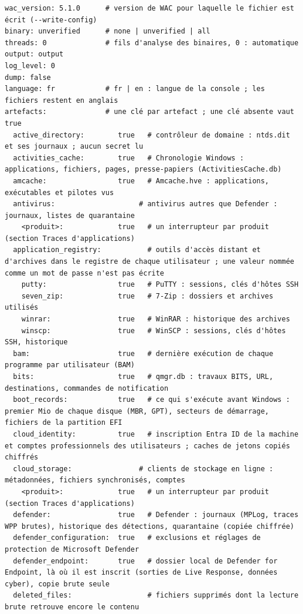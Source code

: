 \documentclass[11pt,a4paper,oneside]{report}
\begin{document}
\begin{lstlisting}
wac_version: 5.1.0      # version de WAC pour laquelle le fichier est écrit (--write-config)
binary: unverified      # none | unverified | all
threads: 0              # fils d'analyse des binaires, 0 : automatique
output: output
log_level: 0
dump: false
language: fr            # fr | en : langue de la console ; les fichiers restent en anglais
artefacts:              # une clé par artefact ; une clé absente vaut true
  active_directory:        true   # contrôleur de domaine : ntds.dit et ses journaux ; aucun secret lu
  activities_cache:        true   # Chronologie Windows : applications, fichiers, pages, presse-papiers (ActivitiesCache.db)
  amcache:                 true   # Amcache.hve : applications, exécutables et pilotes vus
  antivirus:                    # antivirus autres que Defender : journaux, listes de quarantaine
    <produit>:             true   # un interrupteur par produit (section Traces d'applications)
  application_registry:           # outils d'accès distant et d'archives dans le registre de chaque utilisateur ; une valeur nommée comme un mot de passe n'est pas écrite
    putty:                 true   # PuTTY : sessions, clés d'hôtes SSH
    seven_zip:             true   # 7-Zip : dossiers et archives utilisés
    winrar:                true   # WinRAR : historique des archives
    winscp:                true   # WinSCP : sessions, clés d'hôtes SSH, historique
  bam:                     true   # dernière exécution de chaque programme par utilisateur (BAM)
  bits:                    true   # qmgr.db : travaux BITS, URL, destinations, commandes de notification
  boot_records:            true   # ce qui s'exécute avant Windows : premier Mio de chaque disque (MBR, GPT), secteurs de démarrage, fichiers de la partition EFI
  cloud_identity:          true   # inscription Entra ID de la machine et comptes professionnels des utilisateurs ; caches de jetons copiés chiffrés
  cloud_storage:                # clients de stockage en ligne : métadonnées, fichiers synchronisés, comptes
    <produit>:             true   # un interrupteur par produit (section Traces d'applications)
  defender:                true   # Defender : journaux (MPLog, traces WPP brutes), historique des détections, quarantaine (copiée chiffrée)
  defender_configuration:  true   # exclusions et réglages de protection de Microsoft Defender
  defender_endpoint:       true   # dossier local de Defender for Endpoint, là où il est inscrit (sorties de Live Response, données cyber), copie brute seule
  deleted_files:                  # fichiers supprimés dont la lecture brute retrouve encore le contenu

\end{lstlisting}
\end{document}
